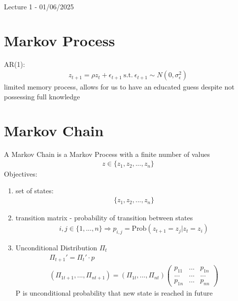 \documentclass[10pt, a4paper]{article}
\newcommand\lecnumber{1 - 01/06/2025}
\begin{document}
  \begin{titlepage}
    \begin{center}
      \vspace*{3cm}
            
      \vspace{1cm}
      \huge
      Lecture \lecnumber
    \end{center}
  \end{titlepage}
  \section*{Markov Process}
  AR(1):
  \begin{gather*}
    z_{t+1} = \rho z_t + \epsilon_{t+1} \ \text{s.t.} \ \epsilon_{t+1}\sim N(0,\sigma_{\epsilon}^2)
  \end{gather*}
  limited memory process, allows for us to have an educated guess despite not possessing full knowledge
  \section*{Markov Chain}
  A Markov Chain is a Markov Process with a finite number of values
  \begin{gather*}
    z\in\{z_1,z_2,...,z_n\}
  \end{gather*}
  Objectives:
  \begin{enumerate}
  \item set of states: 
  \begin{gather*}
    \{z_1,z_2,...,z_n\}
  \end{gather*}
  \item transition matrix - probability of transition between states
  \begin{gather*}
    i,j\in\{1,...,n\}\Rightarrow p_{i,j} = \text{Prob}(z_{t+1}=z_j|z_t = z_i)
  \end{gather*}
  \item Unconditional Distribution $\Pi_t$
  \begin{gather*}
  \Pi_{t+1}' = \Pi_t'\cdot p \\
  (\Pi_{1t+1},...,\Pi_{nt+1}) = (\Pi_{1t},...,\Pi_{nt})\begin{pmatrix}
    p_{11} & ... & p_{1n} \\
    ... & ... & ... \\
    p_{1n} & ... & p_{nn}
    \end{pmatrix}
  \end{gather*}
  P is unconditional probability that new state is reached in future
  \end{enumerate}
\end{document}
